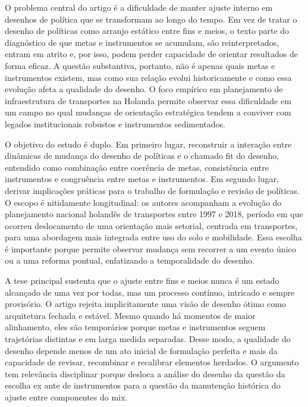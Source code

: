 \documentclass[12pt,a4paper]{article}
\begin{document}
O problema central do artigo é a dificuldade de manter ajuste interno em desenhos de política que se transformam ao longo do tempo. Em vez de tratar o desenho de políticas como arranjo estático entre fins e meios, o texto parte do diagnóstico de que metas e instrumentos se acumulam, são reinterpretados, entram em atrito e, por isso, podem perder capacidade de orientar resultados de forma eficaz. A questão substantiva, portanto, não é apenas quais metas e instrumentos existem, mas como sua relação evolui historicamente e como essa evolução afeta a qualidade do desenho. O foco empírico em planejamento de infraestrutura de transportes na Holanda permite observar essa dificuldade em um campo no qual mudanças de orientação estratégica tendem a conviver com legados institucionais robustos e instrumentos sedimentados. \parencite{geet2019_policy_design}

O objetivo do estudo é duplo. Em primeiro lugar, reconstruir a interação entre dinâmicas de mudança do desenho de políticas e o chamado fit do desenho, entendido como combinação entre coerência de metas, consistência entre instrumentos e congruência entre metas e instrumentos. Em segundo lugar, derivar implicações práticas para o trabalho de formulação e revisão de políticas. O escopo é nitidamente longitudinal: os autores acompanham a evolução do planejamento nacional holandês de transportes entre 1997 e 2018, período em que ocorreu deslocamento de uma orientação mais setorial, centrada em transportes, para uma abordagem mais integrada entre uso do solo e mobilidade. Essa escolha é importante porque permite observar mudança sem recorrer a um evento único ou a uma reforma pontual, enfatizando a temporalidade do desenho. \parencite{geet2019_policy_design}

A tese principal sustenta que o ajuste entre fins e meios nunca é um estado alcançado de uma vez por todas, mas um processo contínuo, intricado e sempre provisório. O artigo rejeita implicitamente uma visão de desenho ótimo como arquitetura fechada e estável. Mesmo quando há momentos de maior alinhamento, eles são temporários porque metas e instrumentos seguem trajetórias distintas e em larga medida separadas. Desse modo, a qualidade do desenho depende menos de um ato inicial de formulação perfeita e mais da capacidade de revisar, recombinar e recalibrar elementos herdados. O argumento tem relevância disciplinar porque desloca a análise do desenho da questão da escolha ex ante de instrumentos para a questão da manutenção histórica do ajuste entre componentes do mix. \parencite{geet2019_policy_design}
\end{document}

